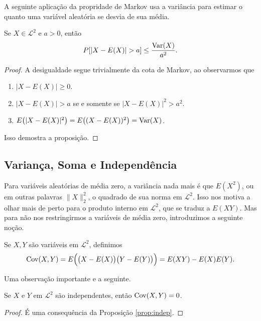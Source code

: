 A seguinte aplicação da propridade de Markov usa a variância para  estimar o quanto uma variável aleatória se desvia de sua média.
\begin{proposition}
  Se $X \in \mathcal{L}^2$ e $a > 0$, então
  \begin{equation}
    P [ |X - E(X)| > a] \leq \frac{\operatorname{Var}(X)}{a^2}.
  \end{equation}
\end{proposition}

\begin{proof}
  A desigualdade segue trivialmente da cota de Markov, ao observarmos que
  \begin{enumerate}[\quad a)]
  \item $|X - E(X)| \geq 0$.
  \item $|X - E(X)| > a$ se e somente se $|X - E(X)|^2 > a^2$.
  \item $E\big(|X - E(X)|^2\big) = E\big((X - E(X))^2\big) = \operatorname{Var}(X)$.
  \end{enumerate}
  Isso demostra a proposição.
\end{proof}

\subsection{Variança, Soma e Independência }
Para variáveis aleatórias de média zero, a variância nada mais é que $E(X^2)$, ou em outras palavras $\lVert X \rVert^2_2$, o quadrado de sua norma em $\mathcal{L}^2$.
Isso nos motiva a olhar mais de perto para o produto interno em $\mathcal{L}^2$, que se traduz a $E(XY)$.
Mas para não nos restringirmos a variáveis de média zero, introduzimos a seguinte noção.

\begin{definition}
  Se $X, Y$ são variáveis em $\mathcal{L}^2$, definimos
  \begin{equation}
    \operatorname{Cov}(X,Y) = E\Big( \big(X - E(X)\big) \big(Y - E(Y)\big) \Big) = E(XY) - E(X)E(Y).
  \end{equation}
\end{definition}

Uma observação importante e a seguinte.
\begin{proposition}
  Se $X$ e $Y$ em $\mathcal{L}^2$ são independentes, então $\operatorname{Cov}(X,Y) = 0$.
\end{proposition}

\begin{proof}
 É uma consequência da Proposição \ref{prop:indep}.
\end{proof}


